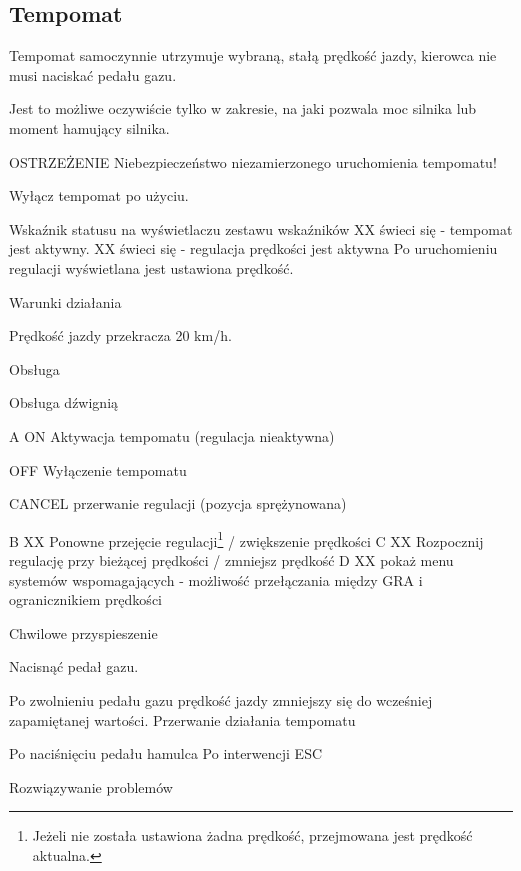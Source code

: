 \subsection{Tempomat}

Tempomat samoczynnie utrzymuje wybraną, stałą prędkość jazdy, kierowca nie musi naciskać pedału gazu.

Jest to możliwe oczywiście tylko w zakresie, na jaki pozwala moc silnika lub moment hamujący silnika.

OSTRZEŻENIE
Niebezpieczeństwo niezamierzonego uruchomienia tempomatu!
\begin{itemizeTriangle}
	\itemTriangle Wyłącz tempomat po użyciu.
\end{itemizeTriangle}

Wskaźnik statusu na wyświetlaczu zestawu wskaźników
XX świeci się - tempomat jest aktywny.
XX świeci się - regulacja prędkości jest aktywna
Po uruchomieniu regulacji wyświetlana jest ustawiona prędkość.

Warunki działania
\begin{itemizeTick}
	\itemTick Prędkość jazdy przekracza 20 km/h.
\end{itemizeTick}

Obsługa

Obsługa dźwignią


A ON Aktywacja tempomatu (regulacja nieaktywna)

OFF Wyłączenie tempomatu

CANCEL przerwanie regulacji (pozycja sprężynowana)

B XX Ponowne przejęcie regulacji\footnote{Jeżeli nie została ustawiona żadna prędkość, przejmowana jest prędkość aktualna.} / zwiększenie prędkości
C XX Rozpocznij regulację przy bieżącej prędkości / zmniejsz prędkość
D XX pokaż menu systemów wspomagających - możliwość przełączania między GRA i ogranicznikiem prędkości

Chwilowe przyspieszenie
\begin{itemizeArrow}
	\itemArrow Nacisnąć pedał gazu.
\end{itemizeArrow}
Po zwolnieniu pedału gazu prędkość jazdy zmniejszy się do wcześniej zapamiętanej wartości.
Przerwanie działania tempomatu
\begin{itemizeTriangle}
	\itemTriangle Po naciśnięciu pedału hamulca
	\itemTriangle Po interwencji ESC
\end{itemizeTriangle}

Rozwiązywanie problemów

